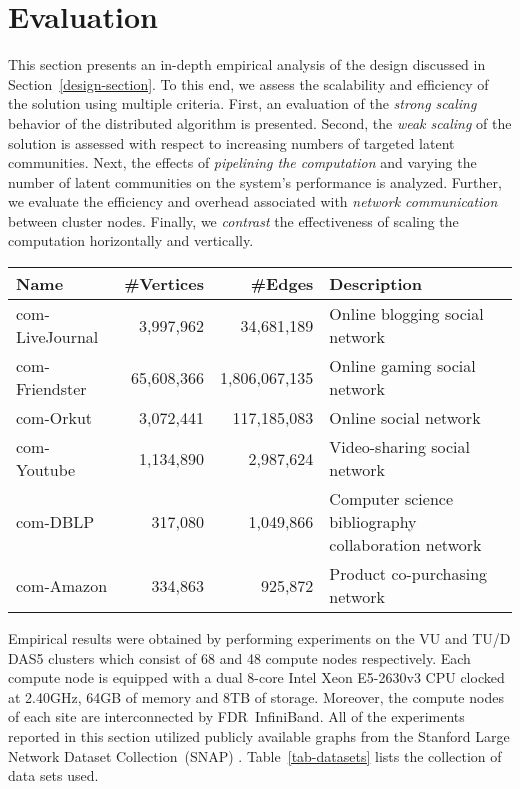 \section{Evaluation}

This section presents an in-depth empirical analysis of the design discussed in
Section~\ref{design-section}. To this end, we assess the scalability and
efficiency of the solution using multiple criteria.
%
First, an evaluation of the \textit{strong scaling} behavior of the distributed
algorithm is presented.
%
Second, the \textit{weak scaling} of the solution is assessed with respect to increasing
numbers of targeted latent communities.
%
Next, the effects of \textit{pipelining the computation} and varying the number of latent communities on the system's
performance is analyzed.
%
Further, we evaluate the efficiency and overhead associated with \textit{network
communication} between cluster nodes.
%
Finally, we \textit{contrast} the effectiveness of scaling the computation horizontally
and vertically.

\begin{table*}
  \centering
  \begin{tabular}{l r r l}
    Name            & \#Vertices &       \#Edges & Description \\
    \hline
    com-LiveJournal &  3,997,962 &    34,681,189 & Online blogging social network \\
    com-Friendster  & 65,608,366 & 1,806,067,135 & Online gaming social network \\
    com-Orkut       &  3,072,441 &   117,185,083 & Online social network \\
    com-Youtube     &  1,134,890 &     2,987,624 & Video-sharing social network \\
    com-DBLP        &    317,080 &     1,049,866 & Computer science bibliography collaboration network \\
    com-Amazon      &    334,863 &       925,872 & Product co-purchasing network \\
    \hline
  \end{tabular}
  \caption{Summary of SNAP graph data sets used for evaluation.}
  \label{tab-datasets}
\end{table*}

Empirical results were obtained by performing experiments on the VU and TU/D
DAS5 clusters which consist of 68 and 48 compute nodes respectively. Each
compute node is equipped with a dual 8-core Intel Xeon E5-2630v3 CPU clocked
at 2.40GHz, 64GB of memory and 8TB of storage. Moreover, the compute nodes of
each site are interconnected by
FDR~InfiniBand. All of the experiments reported in this section utilized
publicly available graphs from the Stanford Large Network Dataset
Collection~(SNAP) \cite{snapnets}. Table~\ref{tab-datasets} lists the
collection of data sets used.


